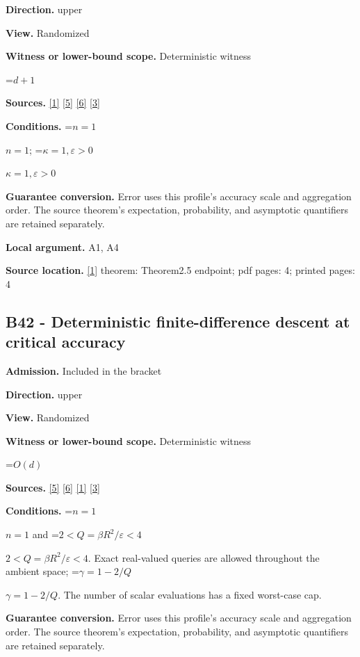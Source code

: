 \documentclass[10pt,a4paper]{article}
\newcommand{\AtlasMath}[1]{\par\begingroup\centering\setbox0=\hbox{$\displaystyle #1$}\ifdim\wd0>1.4\linewidth\typeout{ATLAS WIDE FORMULA: \the\wd0}\fi\ifdim\wd0>\linewidth\resizebox{\linewidth}{!}{\box0}\else\box0\fi\par\endgroup}
\newcommand{\AtlasInlineMath}[1]{\begingroup\setbox0=\hbox{$#1$}\ifdim\wd0>.4\linewidth\endgroup\AtlasMath{#1}\else\endgroup$#1$\fi}
\begin{document}
\textbf{Direction.} upper

\textbf{View.} Randomized

\textbf{Witness or lower-bound scope.} Deterministic witness

\AtlasMath{d+1}
\textbf{Sources.} \href{https://arxiv.org/html/2610.00345v1}{[1]} \href{https://arxiv.org/html/2607.16558v2}{[5]} \href{https://www.mathnet.ru/php/archive.phtml?jrnid=mzm&option_lang=eng&paperid=1697&wshow=paper}{[6]} \href{https://arxiv.org/abs/2109.08858}{[3]}

\textbf{Conditions.} \AtlasInlineMath{n=1}; \AtlasInlineMath{\kappa=1,\varepsilon>0}

\textbf{Guarantee conversion.} Error uses this profile's accuracy scale and aggregation order. The source theorem's expectation, probability, and asymptotic quantifiers are retained separately.

\textbf{Local argument.} A1, A4

\textbf{Source location.} \href{https://arxiv.org/html/2610.00345v1}{[1]} theorem: Theorem2.5 endpoint; pdf pages: 4; printed pages: 4

\subsection{B42 - Deterministic finite-difference descent at critical accuracy}
\textbf{Admission.} Included in the bracket

\textbf{Direction.} upper

\textbf{View.} Randomized

\textbf{Witness or lower-bound scope.} Deterministic witness

\AtlasMath{O(d)}
\textbf{Sources.} \href{https://arxiv.org/html/2607.16558v2}{[5]} \href{https://www.mathnet.ru/php/archive.phtml?jrnid=mzm&option_lang=eng&paperid=1697&wshow=paper}{[6]} \href{https://arxiv.org/html/2610.00345v1}{[1]} \href{https://arxiv.org/abs/2109.08858}{[3]}

\textbf{Conditions.} \AtlasInlineMath{n=1} and \AtlasInlineMath{2<Q=\beta R^2/\varepsilon<4}. Exact real-valued queries are allowed throughout the ambient space; \AtlasInlineMath{\gamma=1-2/Q}. The number of scalar evaluations has a fixed worst-case cap.

\textbf{Guarantee conversion.} Error uses this profile's accuracy scale and aggregation order. The source theorem's expectation, probability, and asymptotic quantifiers are retained separately.
\end{document}

